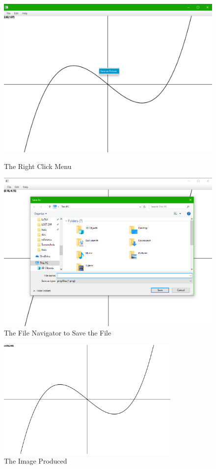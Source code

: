 \documentclass[../../../../main.tex]{subfiles}
\begin{document}
\begin{figure}[H]
\centering
\begin{minipage}{.5\textwidth}
	\centering
  	\includegraphics[width=.8\textwidth]{images/contextMenu}
	\caption{The Right Click Menu}
\end{minipage}%
\begin{minipage}{.5\textwidth}
	\centering
	\includegraphics[width=.8\textwidth]{images/fileNavigator}
	\caption{The File Navigator to Save the File}
\end{minipage}
\end{figure}
\begin{figure}[H]
	\centering
	\includegraphics[width=0.8\textwidth]{images/withCoords}
	\caption{The Image Produced}
\end{figure}
\end{document}
